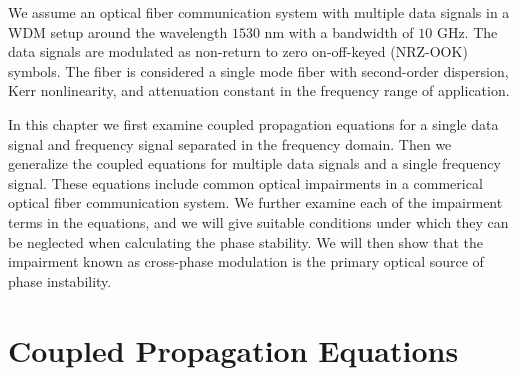 We assume an optical fiber communication system with multiple data signals in a WDM setup around the wavelength $1530$ nm with a bandwidth of $10$ GHz. The data signals are modulated as non-return to zero on-off-keyed (NRZ-OOK) symbols. The fiber is considered a single mode fiber with second-order dispersion, Kerr nonlinearity, and attenuation constant in the frequency range of application.

In this chapter we first examine coupled propagation equations for a single data signal and frequency signal separated in the frequency domain. Then we generalize the coupled equations for multiple data signals and a single frequency signal. These equations include common optical impairments in a commerical optical fiber communication system. We further examine each of the impairment terms in the equations, and we will give suitable conditions under which they can be neglected when calculating the phase stability. We will then show that the impairment known as cross-phase modulation is the primary optical source of phase instability.

\section{Coupled Propagation Equations} \label{sec:cnlse}

